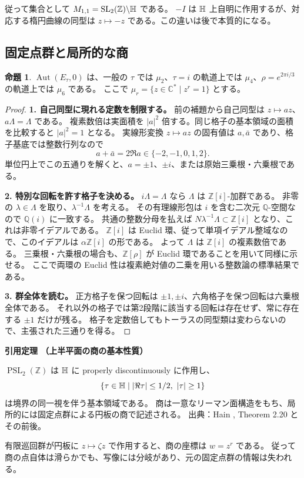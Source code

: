 \documentclass[dvipdfmx,a4paper,11pt]{article}
\theoremstyle{definition}
\newtheorem{prop}[thm]{命題}
\newcommand{\C}{\mathbb C}\newcommand{\R}{\mathbb R}\newcommand{\Z}{\mathbb Z}\newcommand{\Q}{\mathbb Q}
\DeclareMathOperator{\Aut}{Aut}\DeclareMathOperator{\Pic}{Pic}\DeclareMathOperator{\Hom}{Hom}
\DeclareMathOperator{\SL}{SL}\DeclareMathOperator{\PGL}{PGL}\DeclareMathOperator{\PSL}{PSL}
\newenvironment{external}[1]{\Needspace{7\baselineskip}\refstepcounter{thm}\begin{tcolorbox}[mybox,colback=blue!2,colframe=blue!40!black]\textbf{引用定理 \thethm（#1）}\par}{\end{tcolorbox}}
\begin{document}
従って集合として $M_{1,1}=\SL_2(\Z)\backslash\HH$ である。
$-I$ は $\mathbb H$ 上自明に作用するが、対応する楕円曲線の同型は $z\mapsto-z$ である。この違いは後で本質的になる。

\subsection{固定点群と局所的な商}
\begin{prop}\label{prop:ellaut}
$\Aut(E_\tau,0)$ は、一般の $\tau$ では $\mu_2$、$\tau=i$ の軌道上では $\mu_4$、$\rho=e^{2\pi i/3}$ の軌道上では $\mu_6$ である。
ここで $\mu_r=\{z\in\C^*\mid z^r=1\}$ とする。
\end{prop}
\begin{proof}
\textbf{1. 自己同型に現れる定数を制限する。}
前の補題から自己同型は $z\mapsto az$、$a\Lambda=\Lambda$ である。
複素数倍は実面積を $|a|^2$ 倍する。同じ格子の基本領域の面積を比較すると $|a|^2=1$ となる。
実線形変換 $z\mapsto az$ の固有値は $a,\bar a$ であり、格子基底では整数行列なので
\[
a+\bar a=2\Re a\in\{-2,-1,0,1,2\}.
\]
単位円上でこの五通りを解くと、$a=\pm1$、$\pm i$、または原始三乗根・六乗根である。

\textbf{2. 特別な回転を許す格子を決める。}
$i\Lambda=\Lambda$ なら $\Lambda$ は $\Z[i]$-加群である。
非零の $\lambda\in\Lambda$ を取り、$\lambda^{-1}\Lambda$ を考える。
その有理線形包は $i$ を含む二次元 $\Q$-空間なので $\Q(i)$ に一致する。
共通の整数分母を払えば $N\lambda^{-1}\Lambda\subset\Z[i]$ となり、これは非零イデアルである。
$\Z[i]$ は Euclid 環、従って単項イデアル整域なので、このイデアルは $\alpha\Z[i]$ の形である。
よって $\Lambda$ は $\Z[i]$ の複素数倍である。
三乗根・六乗根の場合も、$\Z[\rho]$ が Euclid 環であることを用いて同様に示せる。
ここで両環の Euclid 性は複素絶対値の二乗を用いる整数論の標準結果である。

\textbf{3. 群全体を読む。}
正方格子を保つ回転は $\pm1,\pm i$、六角格子を保つ回転は六乗根全体である。
それ以外の格子では第2段階に該当する回転は存在せず、常に存在する $\pm1$ だけが残る。
格子を定数倍してもトーラスの同型類は変わらないので、主張された三通りを得る。
\end{proof}
\begin{external}{上半平面の商の基本性質}
$\PSL_2(\Z)$ は $\mathbb H$ に properly discontinuously に作用し、
\[
\{\tau\in\mathbb H\mid |\Re\tau|\le1/2,\ |\tau|\ge1\}
\]
は境界の同一視を伴う基本領域である。
商は一意なリーマン面構造をもち、局所的には固定点群による円板の商で記述される。
出典：Hain \cite{Hain}, Theorem 2.20 とその前後。
\end{external}
有限巡回群が円板に $z\mapsto\zeta z$ で作用すると、商の座標は $w=z^r$ である。
従って商の点自体は滑らかでも、写像には分岐があり、元の固定点群の情報は失われる。
\end{document}
